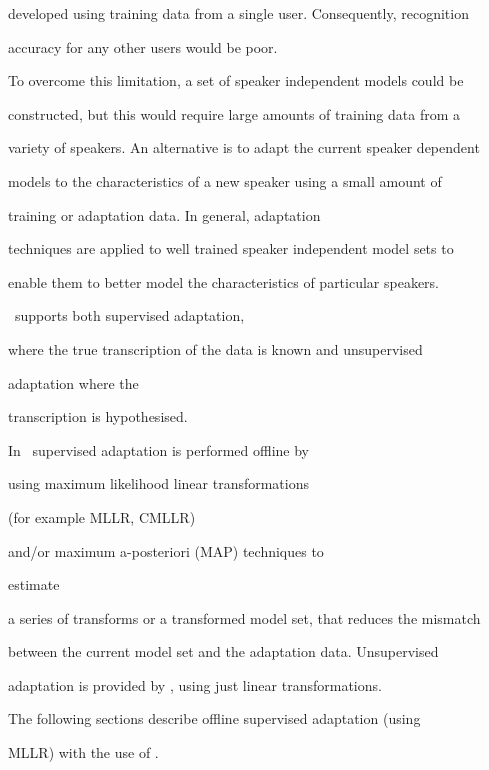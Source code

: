 developed using training data from a single user. Consequently, recognition 


accuracy for any other users would be poor.


To overcome this limitation, a set of speaker independent models could be 


constructed, but this would require large amounts of training data from a 


variety of speakers. An alternative is to adapt the current speaker dependent 


models to the characteristics of a new speaker using a small amount of 


training or adaptation data. In general, adaptation 


techniques are applied to well trained speaker independent model sets to 


enable them to better model the characteristics of particular speakers.





\HTK\ supports both supervised adaptation, 


where the true transcription of the data is known and unsupervised 


adaptation where the


transcription is hypothesised.


In \HTK\ supervised adaptation is performed offline by


 using maximum likelihood linear transformations


(for example MLLR, CMLLR) 


and/or maximum a-posteriori (MAP) techniques to 


estimate


a series of transforms or a transformed model set, that reduces the mismatch 


between the current model set and the adaptation data. Unsupervised 


adaptation is provided by , using just linear transformations.





The following sections describe offline supervised adaptation (using


MLLR) with the use of .





